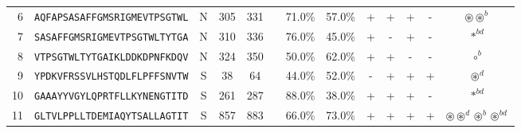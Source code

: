\begin{tabular}{rcccccccccccc}
6  &  \texttt{AQFAPSASAFFGMSRIGMEVTPSGTWL} &       N &    305 &   331 &                                                                  &                          71.0\% &                           57.0\% &          + &           + &          + &           - &                                                                                                                  $ \circledast \circledast^b $ \\
7  &  \texttt{SASAFFGMSRIGMEVTPSGTWLTYTGA} &       N &    310 &   336 &                                                                  &                          76.0\% &                           45.0\% &          + &           - &          + &           - &                                                                                                                                  $ \ast^{bd} $ \\
8  &  \texttt{VTPSGTWLTYTGAIKLDDKDPNFKDQV} &       N &    324 &   350 &                                                                  &                          50.0\% &                           62.0\% &          + &           + &          - &           - &                                                                                                                                    $ \circ^b $ \\
9  &  \texttt{YPDKVFRSSVLHSTQDLFLPFFSNVTW} &       S &     38 &    64 &                                                                  &                          44.0\% &                           52.0\% &          - &           + &          + &           + &                                                                                                                              $ \circledast^d $ \\
10 &  \texttt{GAAAYYVGYLQPRTFLLKYNENGTITD} &       S &    261 &   287 &                                                                  &                          88.0\% &                           38.0\% &          + &           + &          + &           - &                                                                                                                                  $ \ast^{bd} $ \\
11 &  \texttt{GLTVLPPLLTDEMIAQYTSALLAGTIT} &       S &    857 &   883 &                                                                  &                          66.0\% &                           73.0\% &          + &           + &          + &           + &                                                                                   $ \circledast \circledast^d \circledast^b \circledast^{bd} $ \\

\end{tabular}
